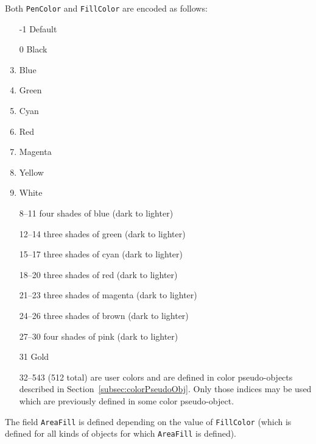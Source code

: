 \documentclass[10pt, a4paper]{article}
\begin{document}
\noindent
Both \texttt{PenColor} and \texttt{FillColor} are encoded as follows: 
%
\begin{enumerate}
\item[-1]    Default
\item[0]     Black
\item        Blue
\item        Green
\item        Cyan
\item        Red
\item        Magenta
\item        Yellow
\item        White
\item[ 8--11] four shades of blue (dark to lighter)
\item[12--14] three shades of green (dark to lighter)
\item[15--17] three shades of cyan (dark to lighter)
\item[18--20] three shades of red (dark to lighter)
\item[21--23] three shades of magenta (dark to lighter)
\item[24--26] three shades of brown (dark to lighter)
\item[27--30] four shades of pink (dark to lighter)
\item[31]    Gold
\item[32--543] (512 total) are user colors and
              are defined in color pseudo-objects 
              described in Section~\ref{subsec:colorPseudoObj}. 
              Only those indices may be used 
              which are previously defined in some color pseudo-object. 
\end{enumerate}

The field \texttt{AreaFill} is defined depending on the value of \texttt{FillColor} 
(which is defined for all kinds of objects 
for which \texttt{AreaFill} is defined). 
\end{document}
